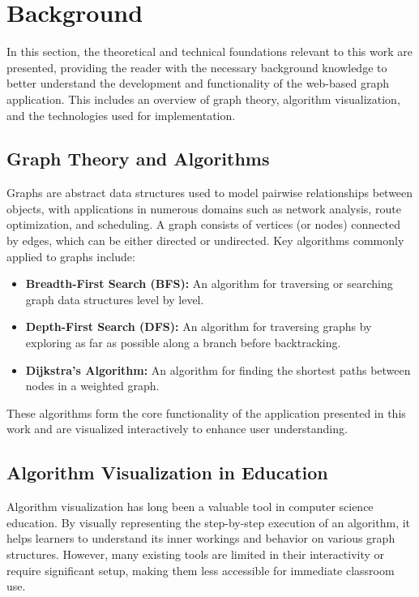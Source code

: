 \section{Background}
\label{sec:background}

In this section, the theoretical and technical foundations relevant to this work are presented, providing the reader with the necessary background knowledge to better understand the development and functionality of the web-based graph application. This includes an overview of graph theory, algorithm visualization, and the technologies used for implementation.

\subsection{Graph Theory and Algorithms}
Graphs are abstract data structures used to model pairwise relationships between objects, with applications in numerous domains such as network analysis, route optimization, and scheduling. A graph consists of vertices (or nodes) connected by edges, which can be either directed or undirected. Key algorithms commonly applied to graphs include:
\begin{itemize}
    \item \textbf{Breadth-First Search (BFS):} An algorithm for traversing or searching graph data structures level by level.
    \item \textbf{Depth-First Search (DFS):} An algorithm for traversing graphs by exploring as far as possible along a branch before backtracking.
    \item \textbf{Dijkstra's Algorithm:} An algorithm for finding the shortest paths between nodes in a weighted graph.
\end{itemize}

These algorithms form the core functionality of the application presented in this work and are visualized interactively to enhance user understanding.

\subsection{Algorithm Visualization in Education}
Algorithm visualization has long been a valuable tool in computer science education. By visually representing the step-by-step execution of an algorithm, it helps learners to understand its inner workings and behavior on various graph structures. However, many existing tools are limited in their interactivity or require significant setup, making them less accessible for immediate classroom use.

